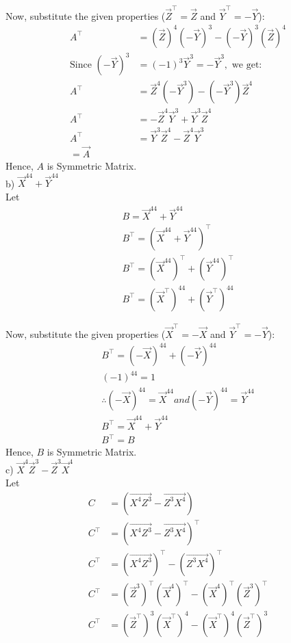 \documentclass[journal]{IEEEtran}
\begin{document}
Now, substitute the given properties ($\vec{Z}^\top= \vec{Z}$ and $\vec{Y}^\top = -\vec{Y}$):
\begin{align}A^\top &= (\vec{Z})^4 (-\vec{Y})^3 - (-\vec{Y})^3 (\vec{Z})^4 \\
\text{Since } (-\vec{Y})^3 &= (-1)^3 \vec{Y}^3 = -\vec{Y}^3, \text{ we get:} \\
A^\top &= \vec{Z}^4 (-\vec{Y}^3) - (-\vec{Y}^3) \vec{Z}^4 \\
A^\top &= -\vec{Z}^4 \vec{Y}^3 + \vec{Y}^3 \vec{Z}^4 \\
A^\top &= \vec{Y}^3 \vec{Z}^4 - \vec{Z}^4 \vec{Y}^3\\
=\vec{A}\end{align}
Hence, $A$ is Symmetric Matrix.\\

b) $\vec{X}^{44} + \vec{Y}^{44}$\\
Let 
\begin{align}
B = \vec{X}^{44} + \vec{Y}^{44}\\
B^\top = (\vec{X}^{44} + \vec{Y}^{44})^\top \\
B^\top = (\vec{X}^{44})^\top + (\vec{Y}^{44})^\top \\
B^\top = (\vec{X}^\top)^{44} + (\vec{Y}^\top)^{44}
\end{align}

Now, substitute the given properties ($\vec{X}^\top = -\vec{X}$ and $\vec{Y}^\top = -\vec{Y}$):
\begin{align}
B^\top = (-\vec{X})^{44} + (-\vec{Y})^{44}\\
(-1)^{44} = 1 \\
\therefore (-\vec{X})^{44} = \vec{X}^{44} and (-\vec{Y})^{44} = \vec{Y}^{44} \\
B^\top = \vec{X}^{44} + \vec{Y}^{44}\\
B^\top=B
\end{align}
Hence, $B$ is Symmetric Matrix.\\

c)  $\vec{X}^4\vec{Z}^3 - \vec{Z}^3\vec{X}^4$\\Let
\begin{align}
C&=(\vec{X^4Z^3} - \vec{Z^3X^4})\\
C^\top &= (\vec{X^4Z^3} - \vec{Z^3X^4})^\top \\
C^\top &= (\vec{X^4Z^3})^\top - (\vec{Z^3X^4})^\top \\
C^\top &= (\vec{Z}^3)^\top(\vec{X}^4)^\top - (\vec{X}^4)^\top(\vec{Z}^3)^\top \\
C^\top &= (\vec{Z}^\top)^3(\vec{X}^\top)^4 - (\vec{X}^\top)^4(\vec{Z}^\top)^3
\end{align}
\end{document}
